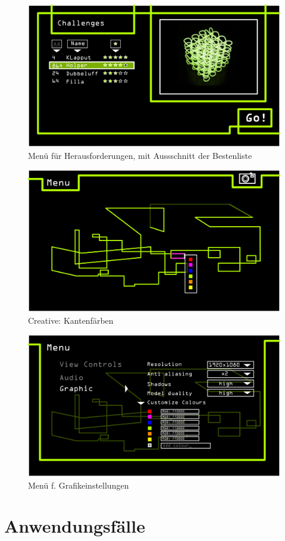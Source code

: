 	\begin{figure}[ht]
	  \centering
	  \includegraphics[width = \textwidth]{Systemmodelle/04_Knot3-select-Challenge.png}
	  \caption{Menü für Herausforderungen, mit Aussschnitt der Bestenliste}
	\end{figure}
	
	\begin{figure}[ht]
	  \centering
	  \includegraphics[width = \textwidth]{Systemmodelle/05_Knot3-Colour-select.png}
	  \caption{Creative: Kantenfärben}
	\end{figure}
	
	\begin{figure}[ht]
	  \centering
	  \includegraphics[width = \textwidth]{Systemmodelle/08_Knot3-menu-graphics.png}
	  \caption{Menü f. Grafikeinstellungen}
	\end{figure}

	
\clearpage
	
\section{Anwendungsfälle}

%	  


